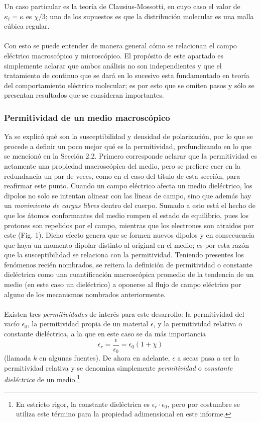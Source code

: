 \documentclass[12pt, notitlepage]{article}
\begin{document}
Un caso particular es la teoría de Clausius-Mossotti, en cuyo caso el valor de $\kappa_i = \kappa$ es $\chi/3$; uno de los supuestos es que la distribución molecular es una malla cúbica regular.\\\\
Con esto se puede entender de manera general cómo se relacionan el campo eléctrico macroscópico y microscópico. El propósito de este apartado es simplemente aclarar que ambos análisis no son independientes y que el tratamiento de continuo que se dará en lo sucesivo esta fundamentado en teoría del comportamiento eléctrico molecular; es por esto que se omiten pasos y sólo se presentan resultados que se consideran importantes.

\subsubsection{Permitividad de un medio macroscópico}
Ya se explicó qué son la susceptibilidad y densidad de polarización, por lo que se procede a definir un poco mejor qué es la permitividad, profundizando en lo que se mencionó en la Sección 2.2.
Primero corresponde aclarar que la permitividad es netamente una propiedad macroscópica del medio, pero se prefiere caer en la redundancia un par de veces, como en el caso del título de esta sección, para reafirmar este punto. Cuando un campo eléctrico afecta un medio dieléctrico, los dipolos no solo se intentan alinear con las líneas de campo, sino que además hay un \textit{movimiento de cargas libres} dentro del cuerpo. Sumado a esto está el hecho de que los átomos conformantes del medio rompen el estado de equilibrio, pues los protones son repelidos por el campo, mientras que los electrones son atraidos por este (Fig. 1). Dicho efecto genera que se formen nuevos dipolos y en consecuencia que haya un momento dipolar distinto al original en el medio; es por esta razón que la susceptibilidad se relaciona con la permitividad. Teniendo presentes los fenómenos recién nombrados, se reitera la definición de permitividad o constante dieléctrica como una cuantificación macroscópica promedio de la tendencia de un medio (en este caso un dieléctrico) a oponerse al flujo de campo eléctrico por alguno de los mecanismos nombrados anteriormente.\\\\
Existen tres \textit{permitividades} de interés para este desarrollo: la permitividad del vacío $\epsilon_0$, la permitividad propia de un material $\epsilon$, y la permitividad relativa o constante dieléctrica, a la que en este caso se da más importancia
\begin{equation}
\epsilon_r = \frac{\epsilon}{\epsilon_0}=\epsilon_0(1+\chi)
\end{equation}
(llamada $k$ en algunas fuentes). De ahora en adelante, $\epsilon$ a secas pasa a ser la permitividad relativa y se denomina simplemente \textit{permitividad} o \textit{constante dieléctrica} de un medio.\footnote{En estricto rigor, la constante dieléctrica es $\epsilon_r\cdot\epsilon_0$, pero por costumbre se utiliza este término para la propiedad adimensional en este informe.}
\end{document}
